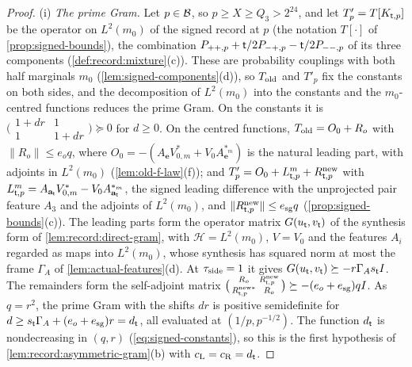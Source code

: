 \begin{proof}
(i) \emph{The prime Gram.} Let $p\in\mathcal B$, so $p\ge X\ge Q_3>2^{24}$, and let
$T'_p=T[K_{\mathsf t,p}]$ be the operator on $L^2(m_0)$ of the signed record at $p$
(the notation $T[\cdot]$ of \cref{prop:signed-bounds}), the combination
$P_{++,p}+\mathsf t/2P_{-+,p}-\mathsf t/2P_{--,p}$ of its three components
(\cref{def:record:mixture}(c)). These are probability couplings with both half
marginals $m_0$ (\cref{lem:signed-components}(d)), so
$T_{\rm old}$ and $T'_p$ fix the constants on both sides, and the decomposition
of $L^2(m_0)$ into the constants and the $m_0$-centred functions reduces the
prime Gram. On the constants it is
$\bigl(\begin{smallmatrix}1+dr&1\\1&1+dr\end{smallmatrix}\bigr)\succeq0$ for
$d\ge0$. On the centred functions, $T_{\rm old}=O_0+R_o$ with
$\|R_o\|\le e_oq$, where $O_0=-(A_{\mathbf e}V_{0,m}^*+V_0A_{\mathbf e}^{*_m})$ is the
natural leading part, with adjoints in $L^2(m_0)$ (\cref{lem:old-f-law}(f));
and $T'_p=O_0+L^m_{\mathsf t,p}+R^{\rm new}_{\mathsf t,p}$ with
$L^m_{\mathsf t,p}=A_{\mathbf a_\mathsf t}V_{0,m}^*-V_0A_{\mathbf a_\mathsf t}^{*_m}$, the signed
leading difference with the unprojected pair feature $A_3$ and the adjoints of
$L^2(m_0)$, and $\|R^{\rm new}_{\mathsf t,p}\|\le e_{\rm sg}q$
(\cref{prop:signed-bounds}(c)). The leading parts form the operator matrix
$G(u_\mathsf t,v_\mathsf t)$ of the synthesis form of \cref{lem:record:direct-gram}, with
$\mathcal H=L^2(m_0)$, $V=V_0$ and the features $A_i$ regarded as maps into
$L^2(m_0)$, whose synthesis has squared norm at most the frame $\Gamma_A$ of
\cref{lem:actual-features}(d). At $\tau_{\mathrm{side}}=1$ it gives
$G(u_\mathsf t,v_\mathsf t)\succeq-r\Gamma_As_\mathsf t I$. The remainders form the self-adjoint
matrix $\bigl(\begin{smallmatrix}R_o&R^{\rm new}_{\mathsf t,p}\\R^{{\rm new}*}_{\mathsf t,p}&R_o
\end{smallmatrix}\bigr)\succeq-(e_o+e_{\rm sg})qI$. As $q=r^2$, the prime Gram with
the shifts $dr$ is positive semidefinite for
$d\ge s_\mathsf t\Gamma_A+(e_o+e_{\rm sg})r=d_\mathsf t$, all evaluated at $(1/p,p^{-1/2})$. The
function $d_\mathsf t$ is nondecreasing in $(q,r)$ (\eqref{eq:signed-constants}), so
this is the first hypothesis of \cref{lem:record:asymmetric-gram}(b) with
$c_{\rm L}=c_{\rm R}=d_\mathsf t$.


\end{proof}
